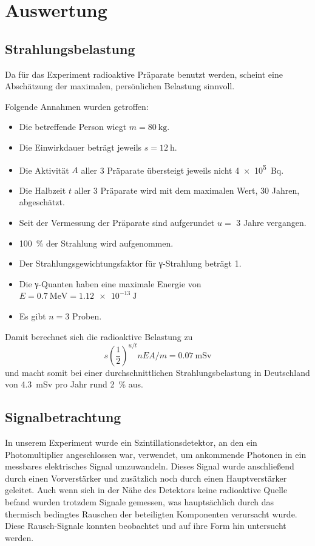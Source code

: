 \section{Auswertung}

\subsection{Strahlungsbelastung}

Da für das Experiment radioaktive Präparate benutzt werden, scheint eine
Abschätzung der maximalen, persönlichen Belastung sinnvoll.

Folgende Annahmen wurden getroffen:
\begin{itemize}
  \item Die betreffende Person wiegt $m = \SI{80}{\kilo\gram}$.
  \item Die Einwirkdauer beträgt jeweils $s = \SI{12}{\hour}$.
  \item Die Aktivität $A$ aller 3 Präparate übersteigt jeweils nicht
        \SI{4e5}{\becquerel}.
  \item Die Halbzeit $t$ aller 3 Präparate wird mit dem maximalen Wert, 30 Jahren,
        abgeschätzt.
  \item Seit der Vermessung der Präparate sind aufgerundet $u = $ 3 Jahre vergangen.
  \item \SI{100}{\percent} der Strahlung wird aufgenommen.
  \item Der Strahlungsgewichtungsfaktor für γ-Strahlung beträgt 1.
  \item Die γ-Quanten haben eine maximale Energie von
        $E = \SI{0.7}{\mega\eV} = \SI{1.12e-13}{\joule}$
  \item Es gibt $n = 3$ Proben.
\end{itemize}
Damit berechnet sich die radioaktive Belastung zu
\begin{equation}
  s \left(\frac{1}{2}\right)^{u/t} n E A / m = \SI{0.07}{\milli\sievert}
\end{equation}
und macht somit bei einer durchschnittlichen Strahlungsbelastung in Deutschland von
\SI{4.3}{\milli\sievert} pro Jahr rund \SI{2}{\percent} aus.

\subsection{Signalbetrachtung}
In unserem Experiment wurde ein Szintillationsdetektor, an den ein
Photomultiplier angeschlossen war, verwendet, um ankommende Photonen in ein
messbares elektrisches Signal umzuwandeln. Dieses Signal wurde anschließend
durch einen Vorverstärker und zusätzlich noch durch einen Hauptverstärker
geleitet. Auch wenn sich in der Nähe des Detektors keine radioaktive Quelle
befand wurden trotzdem Signale gemessen, was hauptsächlich durch das thermisch
bedingtes Rauschen der beteiligten Komponenten verursacht wurde. Diese
Rausch-Signale konnten beobachtet und auf ihre Form hin untersucht werden.

